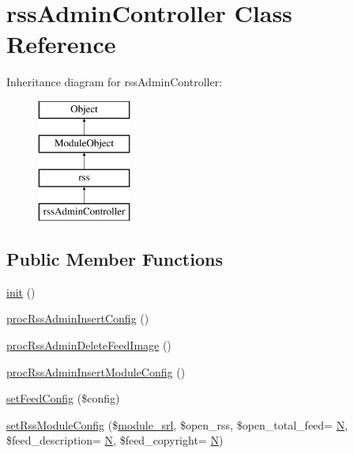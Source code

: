 \hypertarget{classrssAdminController}{}\section{rss\+Admin\+Controller Class Reference}
\label{classrssAdminController}
Inheritance diagram for rss\+Admin\+Controller\+:\begin{figure}[H]
\begin{center}
\leavevmode
\includegraphics[height=4.000000cm]{classrssAdminController}
\end{center}
\end{figure}
\subsection*{Public Member Functions}
\begin{DoxyCompactItemize}
\item 
\hyperlink{classrssAdminController_ad73e127c3d6191b7d82e2fd3f50ef477}{init} ()
\item 
\hyperlink{classrssAdminController_abacdc1717d07ac5cfe2d4bb83f08d310}{proc\+Rss\+Admin\+Insert\+Config} ()
\item 
\hyperlink{classrssAdminController_a37eed33f761ae0a1cdcce49562bed601}{proc\+Rss\+Admin\+Delete\+Feed\+Image} ()
\item 
\hyperlink{classrssAdminController_ae07c8748cdccb2d13dfb4140e9c13aeb}{proc\+Rss\+Admin\+Insert\+Module\+Config} ()
\item 
\hyperlink{classrssAdminController_a57c67e2413e7d6491f090975531094cd}{set\+Feed\+Config} (\$config)
\item 
\hyperlink{classrssAdminController_a4dfe5a37da285c2421b574923a5bcbf8}{set\+Rss\+Module\+Config} (\$\hyperlink{ko_8install_8php_a370bb6450fab1da3e0ed9f484a38b761}{module\+\_\+srl}, \$open\+\_\+rss, \$open\+\_\+total\+\_\+feed= \textquotesingle{}\hyperlink{jquery-1_8x_8min_8js_ab8a5cba0bbaa18ec7f830663874cb9d0}{N}\textquotesingle{}, \$feed\+\_\+description= \textquotesingle{}\hyperlink{jquery-1_8x_8min_8js_ab8a5cba0bbaa18ec7f830663874cb9d0}{N}\textquotesingle{}, \$feed\+\_\+copyright= \textquotesingle{}\hyperlink{jquery-1_8x_8min_8js_ab8a5cba0bbaa18ec7f830663874cb9d0}{N}\textquotesingle{})
\end{DoxyCompactItemize}
